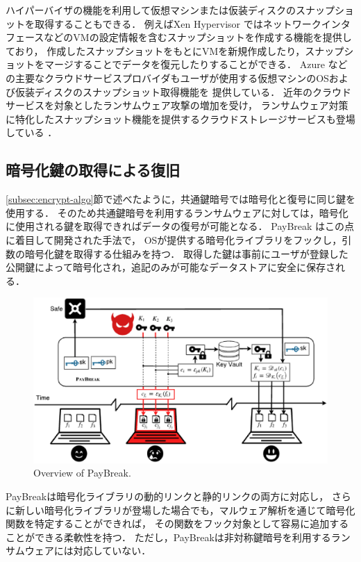 ハイパーバイザの機能を利用して仮想マシンまたは仮装ディスクのスナップショットを取得することもできる．
例えばXen Hypervisor \cite{xenHV}ではネットワークインタフェースなどのVMの設定情報を含むスナップショットを作成する機能を提供しており，
作成したスナップショットをもとにVMを新規作成したり，スナップショットをマージすることでデータを復元したりすることができる．
Azure \cite{azure-backup}などの主要なクラウドサービスプロバイダもユーザが使用する仮想マシンのOSおよび仮装ディスクのスナップショット取得機能を
提供している．
近年のクラウドサービスを対象としたランサムウェア攻撃の増加\cite{zscaler-ransomware}を受け，
ランサムウェア対策に特化したスナップショット機能を提供するクラウドストレージサービスも登場している \cite{huawei-solution}．

\subsection{暗号化鍵の取得による復旧}
\ref{subsec:encrypt-algo}節で述べたように，共通鍵暗号では暗号化と復号に同じ鍵を使用する．
そのため共通鍵暗号を利用するランサムウェアに対しては，暗号化に使用される鍵を取得できればデータの復号が可能となる．
PayBreak \cite{kolodenker2017paybreak} はこの点に着目して開発された手法で，
OSが提供する暗号化ライブラリをフックし，引数の暗号化鍵を取得する仕組みを持つ．
取得した鍵は事前にユーザが登録した公開鍵によって暗号化され，追記のみが可能なデータストアに安全に保存される．
\begin{figure}[t]
  \begin{center}
    \includegraphics[width=\columnwidth]{doc/img/paybreak-overview.eps}
  \end{center}
  \caption{Overview of PayBreak. \cite{kolodenker2017paybreak}}
  \label{fig:paybreak-overview}
\end{figure}
PayBreakは暗号化ライブラリの動的リンクと静的リンクの両方に対応し，
さらに新しい暗号化ライブラリが登場した場合でも，マルウェア解析を通じて暗号化関数を特定することができれば，
その関数をフック対象として容易に追加することができる柔軟性を持つ．
ただし，PayBreakは非対称鍵暗号を利用するランサムウェアには対応していない．

